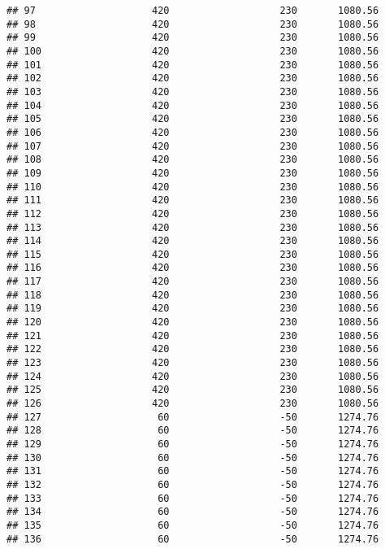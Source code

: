 \documentclass[]{article}
\begin{document}
\begin{verbatim}
## 97                    420                   230       1080.56
## 98                    420                   230       1080.56
## 99                    420                   230       1080.56
## 100                   420                   230       1080.56
## 101                   420                   230       1080.56
## 102                   420                   230       1080.56
## 103                   420                   230       1080.56
## 104                   420                   230       1080.56
## 105                   420                   230       1080.56
## 106                   420                   230       1080.56
## 107                   420                   230       1080.56
## 108                   420                   230       1080.56
## 109                   420                   230       1080.56
## 110                   420                   230       1080.56
## 111                   420                   230       1080.56
## 112                   420                   230       1080.56
## 113                   420                   230       1080.56
## 114                   420                   230       1080.56
## 115                   420                   230       1080.56
## 116                   420                   230       1080.56
## 117                   420                   230       1080.56
## 118                   420                   230       1080.56
## 119                   420                   230       1080.56
## 120                   420                   230       1080.56
## 121                   420                   230       1080.56
## 122                   420                   230       1080.56
## 123                   420                   230       1080.56
## 124                   420                   230       1080.56
## 125                   420                   230       1080.56
## 126                   420                   230       1080.56
## 127                    60                   -50       1274.76
## 128                    60                   -50       1274.76
## 129                    60                   -50       1274.76
## 130                    60                   -50       1274.76
## 131                    60                   -50       1274.76
## 132                    60                   -50       1274.76
## 133                    60                   -50       1274.76
## 134                    60                   -50       1274.76
## 135                    60                   -50       1274.76
## 136                    60                   -50       1274.76

\end{verbatim}
\end{document}
